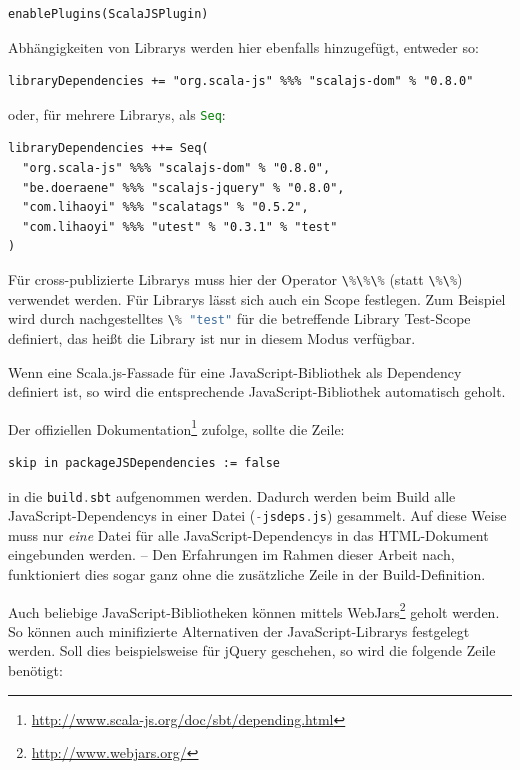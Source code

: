 \documentclass[a4paper, 12pt, hidelinks, listof=totoc, listoftables=totoc, bibliography=totoc]{scrreprt}
\newcommand{\code}[1]{\lstinline[language=Scala, style=inline]|#1|}
\begin{document}
\begin{lstlisting}[style=snippet]
enablePlugins(ScalaJSPlugin)
\end{lstlisting}

Abhängigkeiten von Librarys werden hier ebenfalls hinzugefügt, entweder so:

\begin{lstlisting}[style=snippet]
libraryDependencies += "org.scala-js" %%% "scalajs-dom" % "0.8.0"
\end{lstlisting}

oder, für mehrere Librarys, als \code{Seq}:

\begin{lstlisting}[style=snippet]
libraryDependencies ++= Seq(
  "org.scala-js" %%% "scalajs-dom" % "0.8.0",
  "be.doeraene" %%% "scalajs-jquery" % "0.8.0",
  "com.lihaoyi" %%% "scalatags" % "0.5.2",
  "com.lihaoyi" %%% "utest" % "0.3.1" % "test"
)
\end{lstlisting}

Für cross-publizierte Librarys muss hier der Operator \code{\%\%\%} (statt \code{\%\%}) verwendet werden. Für Librarys lässt sich auch ein Scope festlegen. Zum Beispiel wird durch nachgestelltes \code{\% "test"} für die betreffende Library Test-Scope definiert, das heißt die Library ist nur in diesem Modus verfügbar.

Wenn eine Scala.js-Fassade für eine JavaScript-Bibliothek als Dependency definiert ist, so wird die entsprechende JavaScript-Bibliothek automatisch geholt.

Der offiziellen Dokumentation\footnote{ \url{http://www.scala-js.org/doc/sbt/depending.html}} zufolge, sollte die Zeile:

\begin{lstlisting}[style=snippet]
skip in packageJSDependencies := false
\end{lstlisting}

in die \code{build.sbt} aufgenommen werden. Dadurch werden beim Build alle JavaScript-Dependencys in einer Datei (\code{-jsdeps.js}) gesammelt. Auf diese Weise muss nur \emph{eine} Datei für alle JavaScript-Dependencys in das \ac{HTML}-Dokument eingebunden werden. -- Den Erfahrungen im Rahmen dieser Arbeit nach, funktioniert dies sogar ganz ohne die zusätzliche Zeile in der Build-Definition.

Auch beliebige JavaScript-Bibliotheken können mittels WebJars\footnote{\url{http://www.webjars.org/}} geholt werden. So können auch minifizierte Alternativen der JavaScript-Librarys festgelegt werden. Soll dies beispielsweise für jQuery geschehen, so wird die folgende Zeile benötigt:
\end{document}
